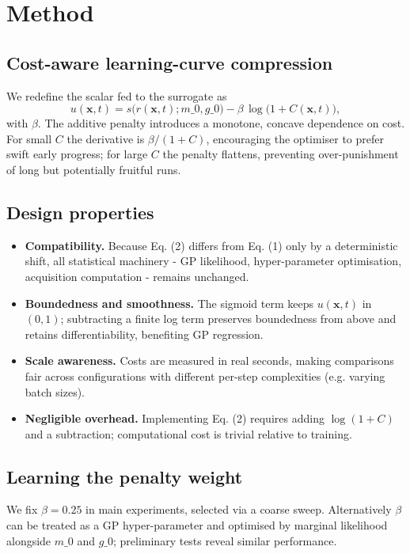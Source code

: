 \documentclass{article} %
\begin{document}
\section{Method}
\label{sec:method}
\subsection{Cost-aware learning-curve compression}
We redefine the scalar fed to the surrogate as
\begin{equation}\tag{2}
  u(\mathbf{x}, t) = s\big(r(\mathbf{x}, t); m\_0, g\_0\big) - \beta\,\log\!\big(1 + C(\mathbf{x}, t)\big),
\end{equation}
with \(\beta\). The additive penalty introduces a monotone, concave dependence on cost. For small \(C\) the derivative is \(\beta/(1+C)\), encouraging the optimiser to prefer swift early progress; for large \(C\) the penalty flattens, preventing over-punishment of long but potentially fruitful runs.

\subsection{Design properties}
\begin{itemize}
  \item \textbf{Compatibility.} Because Eq. (2) differs from Eq. (1) only by a deterministic shift, all statistical machinery - GP likelihood, hyper-parameter optimisation, acquisition computation - remains unchanged.
  \item \textbf{Boundedness and smoothness.} The sigmoid term keeps \(u(\mathbf{x}, t)\) in \((0,1)\); subtracting a finite log term preserves boundedness from above and retains differentiability, benefiting GP regression.
  \item \textbf{Scale awareness.} Costs are measured in real seconds, making comparisons fair across configurations with different per-step complexities (e.g. varying batch sizes).
  \item \textbf{Negligible overhead.} Implementing Eq. (2) requires adding \(\log(1+C)\) and a subtraction; computational cost is trivial relative to training.
\end{itemize}

\subsection{Learning the penalty weight}
We fix \(\beta = 0.25\) in main experiments, selected via a coarse sweep. Alternatively \(\beta\) can be treated as a GP hyper-parameter and optimised by marginal likelihood alongside \(m\_0\) and \(g\_0\); preliminary tests reveal similar performance.
\end{document}
